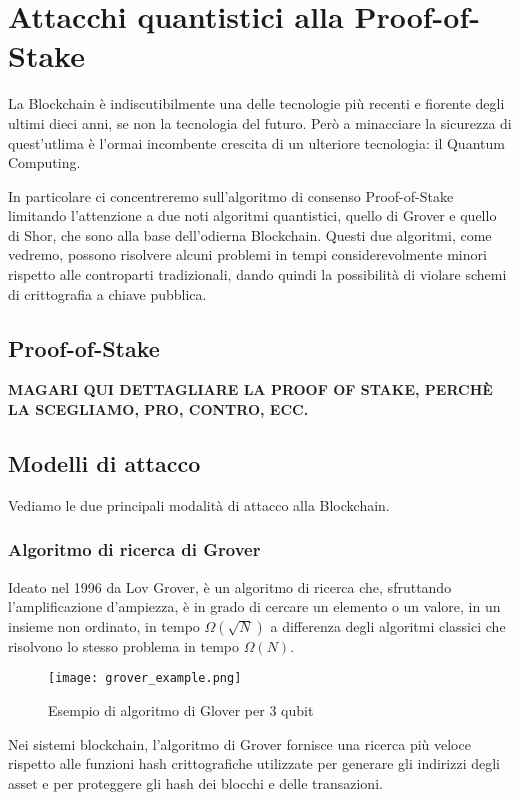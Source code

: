 \chapter{Attacchi quantistici alla Proof-of-Stake}
La Blockchain è indiscutibilmente una delle tecnologie più recenti e fiorente degli ultimi dieci anni, se non la tecnologia del futuro. Però a minacciare la sicurezza di quest'utlima è l'ormai incombente crescita di un ulteriore tecnologia: il Quantum Computing.

In particolare ci concentreremo sull'algoritmo di consenso Proof-of-Stake limitando l'attenzione a due noti algoritmi quantistici, quello di Grover e quello di Shor, che sono alla base dell'odierna Blockchain. Questi due algoritmi, come vedremo, possono risolvere alcuni problemi in tempi considerevolmente minori rispetto alle controparti tradizionali, dando quindi la possibilità di violare schemi di crittografia a chiave pubblica.

\section{Proof-of-Stake}
\textbf{MAGARI QUI DETTAGLIARE LA PROOF OF STAKE, PERCHÈ LA SCEGLIAMO, PRO, CONTRO, ECC.}

\section{Modelli di attacco}
Vediamo le due principali modalità di attacco alla Blockchain.

\subsection{Algoritmo di ricerca di Grover}
Ideato nel 1996 da Lov Grover, è un algoritmo di ricerca che, sfruttando l'amplificazione d'ampiezza, è in grado di cercare un elemento o un valore, in un insieme non ordinato, in tempo \(\Omega\left(\sqrt{N}\right)\) a differenza degli algoritmi classici che risolvono lo stesso problema in tempo \(\Omega\left(N\right)\).

\begin{figure}[h]
  \centering
  \texttt{[image: grover\_example.png]}
  \caption{Esempio di algoritmo di Glover per 3 qubit}
  \label{fig:grover_example}
\end{figure}

Nei sistemi blockchain, l'algoritmo di Grover fornisce una ricerca più veloce rispetto alle funzioni hash crittografiche utilizzate per generare gli indirizzi degli asset e per proteggere gli hash dei blocchi e delle transazioni.

